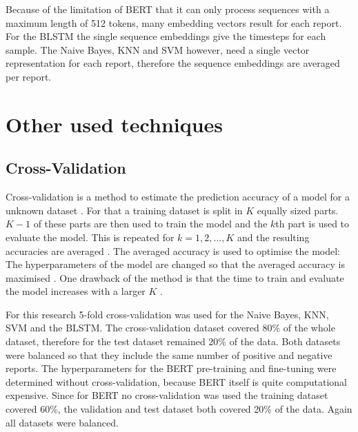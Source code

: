 Because of the limitation of \ac{BERT} that it can only process sequences with a maximum length of 512 tokens, many embedding vectors result for each report.
For the \ac{BLSTM} the single sequence embeddings give the timesteps for each sample.
The Naive Bayes, \ac{KNN} and \ac{SVM} however, need a single vector representation for each report, therefore the sequence embeddings are averaged per report.

\section{Other used techniques}
\subsection{Cross-Validation}
\label{subsec:cross_validation}
Cross-validation is a method to estimate the prediction accuracy of a model for a unknown dataset \cite[p. 241]{Hastie2009}.
For that a training dataset is split in $K$ equally sized parts.
$K-1$ of these parts are then used to train the model and the $k$th part is used to evaluate the model.
This is repeated for $k=1,2,...,K$ and the resulting accuracies are averaged \cite[p. 242]{Hastie2009}.
The averaged accuracy is used to optimise the model:
The hyperparameters of the model are changed so that the averaged accuracy is maximised \cite[p. 242]{Hastie2009}.
One drawback of the method is that the time to train and evaluate the model increases with a larger $K$ \cite[p. 242]{Hastie2009}.

For this research 5-fold cross-validation was used for the Naive Bayes, \ac{KNN}, \ac{SVM} and the \ac{BLSTM}.
The cross-validation dataset covered 80\% of the whole dataset, therefore for the test dataset remained 20\% of the data.
Both datasets were balanced so that they include the same number of positive and negative reports.
The hyperparameters for the \ac{BERT} pre-training and fine-tuning were determined without cross-validation, because \ac{BERT} itself is quite computational expensive.
Since for \ac{BERT} no cross-validation was used the training dataset covered 60\%, the validation and test dataset both covered 20\% of the data.
Again all datasets were balanced.

